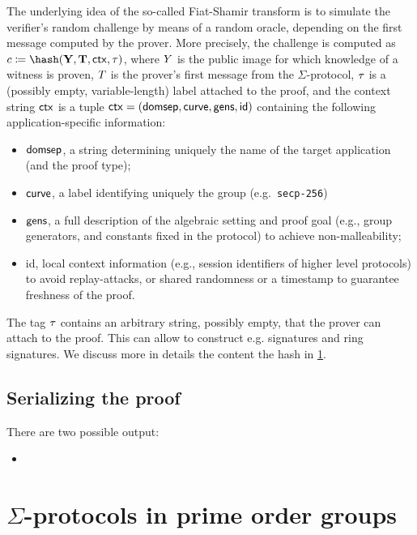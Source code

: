 \documentclass[runningheads,11pt]{article}
\begin{document}
The underlying idea of the so-called Fiat-Shamir transform is to simulate the verifier's random challenge by means of a random oracle, depending on the first message computed by the prover.
More precisely, the challenge is computed as
$c\defeq\hash(\vec \statement,\vec \commitment, \ctx, \stag)$,
where $Y$ is the public image for which knowledge of a witness is proven, $T$ is the prover's first message from the $\Sigma$-protocol, $\tau$ is a (possibly empty, variable-length) label attached to the proof, and
the context string $\mathsf{ctx}$ is a tuple $\mathsf{ctx} = (\textsf{domsep}, \textsf{curve}, \textsf{gens}, \textsf{id})$ containing the following application-specific information:
\begin{itemize}
  \item $\textsf{domsep}$, a string determining uniquely the name of the target application (and the proof type);
  \item $\textsf{curve}$, a label identifying uniquely the group (e.g.\ \verb|secp-256|)
  \item $\textsf{gens}$,
    a full description of the algebraic setting and proof goal (e.g., group generators, and constants fixed in the protocol) to achieve non-malleability;
  \item \textsf{id},
    local context information (e.g., session identifiers of higher level protocols) to avoid replay-attacks, or shared randomness or a timestamp to guarantee freshness of the proof.
\end{itemize}
The tag $\tau$ contains an arbitrary string, possibly empty, that the prover can attach to the proof. This can allow to construct e.g. signatures and ring signatures.
We discuss more in details the content the hash in \cref{sec:instantiation}.

\subsection{Serializing the proof}

There are two possible output:
\begin{itemize}
\item
\end{itemize}

\section{$\Sigma$-protocols in prime order groups}
\label{sec:instantiation}

\end{document}

